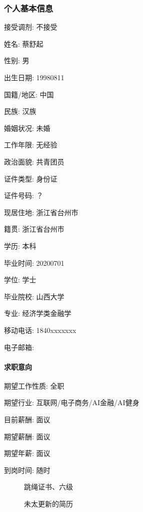 \documentclass[letterpaper,11pt,english]{sphinxmanual}
\begin{document}
\subsubsection{个人基本信息}
\label{\detokenize{get_started:id11}}
接受调剂: 不接受

姓名: 蔡舒起

性别: 男

出生日期: 1998\sphinxhyphen{}08\sphinxhyphen{}11

国籍/地区: 中国

民族: 汉族

婚姻状况: 未婚

工作年限: 无经验

政治面貌: 共青团员

证件类型: 身份证

证件号码: ？

现居住地: 浙江省\sphinxhyphen{}台州市

籍贯: 浙江省\sphinxhyphen{}台州市

学历: 本科

毕业时间: 2020\sphinxhyphen{}07\sphinxhyphen{}01

学位: 学士

毕业院校: 山西大学

专业: 经济学类\sphinxhyphen{}金融学

移动电话: 1840xxxxxxx

电子邮箱: 


\paragraph{求职意向}
\label{\detokenize{get_started:id12}}
期望工作性质: 全职

期望行业: 互联网/电子商务/AI金融/AI健身

目前薪酬: 面议

期望薪酬: 面议

期望年薪: 面议

到岗时间: 随时

\begin{figure}[H]
\centering
\capstart

\noindent{}
\caption{跳绳证书、六级}\label{\detokenize{get_started:id18}}\end{figure}

\begin{figure}[H]
\centering
\capstart

\noindent{}
\caption{未太更新的简历}\label{\detokenize{get_started:id19}}\end{figure}
\end{document}
